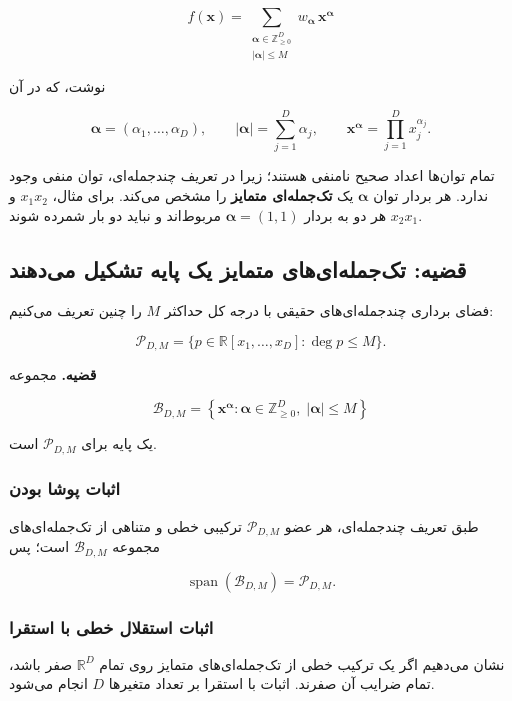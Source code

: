 \documentclass[12pt,a4paper]{article}
\begin{document}
\[
f(\mathbf{x})=
\sum_{\substack{\boldsymbol{\alpha}\in\mathbb{Z}_{\geq0}^{D}\\
                 |\boldsymbol{\alpha}|\leq M}}
w_{\boldsymbol{\alpha}}\,\mathbf{x}^{\boldsymbol{\alpha}}
\]

نوشت، که در آن

\[
\boldsymbol{\alpha}=(\alpha_1,\ldots,\alpha_D),\qquad
|\boldsymbol{\alpha}|=\sum_{j=1}^{D}\alpha_j,\qquad
\mathbf{x}^{\boldsymbol{\alpha}}=\prod_{j=1}^{D}x_j^{\alpha_j}.
\]

تمام توان‌ها اعداد صحیح نامنفی هستند؛ زیرا در تعریف
چندجمله‌ای، توان منفی وجود ندارد. هر بردار توان
$\boldsymbol{\alpha}$ یک \textbf{تک‌جمله‌ای متمایز}
را مشخص می‌کند. برای مثال، $x_1x_2$ و $x_2x_1$
هر دو به بردار $\boldsymbol{\alpha}=(1,1)$ مربوط‌اند
و نباید دو بار شمرده شوند.

\subsection{قضیه: تک‌جمله‌ای‌های متمایز یک پایه تشکیل می‌دهند}

فضای برداری چندجمله‌ای‌های حقیقی با درجه کل حداکثر $M$
را چنین تعریف می‌کنیم:

\[
\mathcal{P}_{D,M}
=\bigl\{p\in\mathbb{R}[x_1,\ldots,x_D]:\deg p\leq M\bigr\}.
\]

\textbf{قضیه.}
مجموعه

\[
\mathcal{B}_{D,M}
=\left\{
\mathbf{x}^{\boldsymbol{\alpha}}:
\boldsymbol{\alpha}\in\mathbb{Z}_{\geq0}^{D},\;
|\boldsymbol{\alpha}|\leq M
\right\}
\]

یک پایه برای $\mathcal{P}_{D,M}$ است.

\subsubsection{اثبات پوشا بودن}

طبق تعریف چندجمله‌ای، هر عضو $\mathcal{P}_{D,M}$
ترکیبی خطی و متناهی از تک‌جمله‌ای‌های مجموعه
$\mathcal{B}_{D,M}$ است؛ پس

\[
\operatorname{span}(\mathcal{B}_{D,M})
=\mathcal{P}_{D,M}.
\]

\subsubsection{اثبات استقلال خطی با استقرا}

نشان می‌دهیم اگر یک ترکیب خطی از تک‌جمله‌ای‌های
متمایز روی تمام $\mathbb{R}^{D}$ صفر باشد،
تمام ضرایب آن صفرند. اثبات با استقرا بر تعداد
متغیرها $D$ انجام می‌شود.
\end{document}

